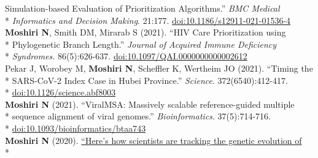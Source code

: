 \documentclass[margin,line]{res}
\begin{document}
\begin{resume}
\hspace*{9mm} Simulation-based Evaluation of Prioritization Algorithms.'' \textit{BMC Medical}\\*\vspace{2mm}
\hspace*{8mm} \textit{Informatics and Decision Making}. 21:177. \href{https://doi.org/10.1186/s12911-021-01536-4}{doi:10.1186/s12911-021-01536-4}\\
\hspace*{4mm} \textbf{Moshiri N}, Smith DM, Mirarab S (2021). ``HIV Care Prioritization using\\*
\hspace*{9mm} Phylogenetic Branch Length.'' \textit{Journal of Acquired Immune Deficiency}\\*\vspace{2mm}
\hspace*{8mm} \textit{Syndromes}. 86(5):626-637. \href{https://doi.org/10.1097/QAI.0000000000002612}{doi:10.1097/QAI.0000000000002612}\\
\hspace*{4mm} Pekar J, Worobey M, \textbf{Moshiri N}, Scheffler K, Wertheim JO (2021). ``Timing the\\*
\hspace*{9mm} SARS-CoV-2 Index Case in Hubei Province.'' \textit{Science}. 372(6540):412-417.\\*\vspace{2mm}
\hspace*{8mm} \href{https://doi.org/10.1126/science.abf8003}{doi:10.1126/science.abf8003}\\
\hspace*{4mm} \textbf{Moshiri N} (2021). ``ViralMSA: Massively scalable reference-guided multiple\\*
\hspace*{9mm} sequence alignment of viral genomes.'' \textit{Bioinformatics}. 37(5):714-716.\\*\vspace{2mm}
\hspace*{8mm} \href{https://doi.org/10.1093/bioinformatics/btaa743}{doi:10.1093/bioinformatics/btaa743}\\
\hspace*{4mm} \textbf{Moshiri N} (2020). \href{https://theconversation.com/heres-how-scientists-are-tracking-the-genetic-evolution-of-covid-19-134201}{``Here's how scientists are tracking the genetic evolution of}\\*\vspace{2mm}

\end{resume}
\end{document}
